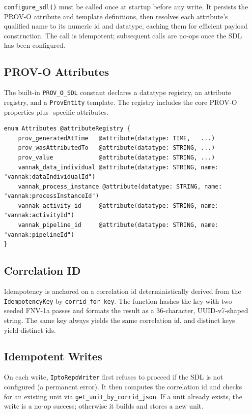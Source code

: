 \texttt{configure\_sdl()} must be called once at startup before any write. It
persists the PROV-O attribute and template definitions, then resolves each
attribute's qualified name to its numeric id and datatype, caching them for
efficient payload construction. The call is idempotent; subsequent calls are
no-ops once the SDL has been configured.

\subsection{PROV-O Attributes}

The built-in \texttt{PROV\_O\_SDL} constant declares a datatype registry, an
attribute registry, and a \texttt{ProvEntity} template. The registry includes
the core PROV-O properties plus \vannak{}-specific attributes.

\begin{lstlisting}[numbers=none]
enum Attributes @attributeRegistry {
    prov_generatedAtTime   @attribute(datatype: TIME,   ...)
    prov_wasAttributedTo   @attribute(datatype: STRING, ...)
    prov_value             @attribute(datatype: STRING, ...)
    vannak_data_individual @attribute(datatype: STRING, name: "vannak:dataIndividualId")
    vannak_process_instance @attribute(datatype: STRING, name: "vannak:processInstanceId")
    vannak_activity_id     @attribute(datatype: STRING, name: "vannak:activityId")
    vannak_pipeline_id     @attribute(datatype: STRING, name: "vannak:pipelineId")
}
\end{lstlisting}

\subsection{Correlation ID}

Idempotency is anchored on a correlation id deterministically derived from the
\texttt{IdempotencyKey} by \texttt{corrid\_for\_key}. The function hashes the
key with two seeded FNV-1a passes and formats the result as a 36-character,
UUID-v7-shaped string. The same key always yields the same correlation id, and
distinct keys yield distinct ids.

\subsection{Idempotent Writes}

On each write, \texttt{IptoRepoWriter} first refuses to proceed if the SDL is
not configured (a permanent error). It then computes the correlation id and
checks for an existing unit via \texttt{get\_unit\_by\_corrid\_json}. If a unit
already exists, the write is a no-op success; otherwise it builds and stores a
new unit.

